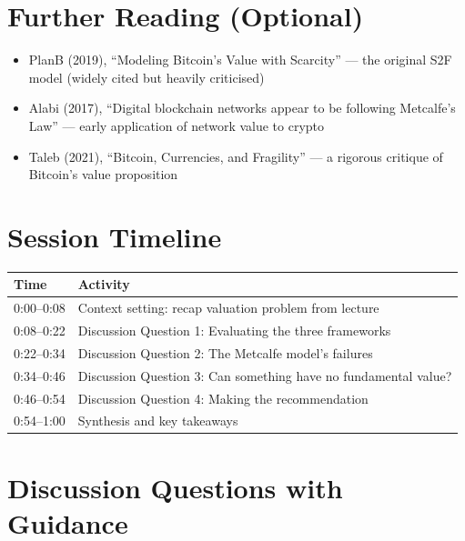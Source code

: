 \documentclass[11pt]{article}
\begin{document}
\section*{Further Reading (Optional)}

\begin{itemize}[leftmargin=*]
\item PlanB (2019), ``Modeling Bitcoin's Value with Scarcity'' --- the original S2F model (widely cited but heavily criticised)
\item Alabi (2017), ``Digital blockchain networks appear to be following Metcalfe's Law'' --- early application of network value to crypto
\item Taleb (2021), ``Bitcoin, Currencies, and Fragility'' --- a rigorous critique of Bitcoin's value proposition
\end{itemize}

\newpage


\section*{Session Timeline}

\begin{center}
\begin{tabular}{ll}
\toprule
\textbf{Time} & \textbf{Activity} \\
\midrule
0:00--0:08 & Context setting: recap valuation problem from lecture \\
0:08--0:22 & Discussion Question 1: Evaluating the three frameworks \\
0:22--0:34 & Discussion Question 2: The Metcalfe model's failures \\
0:34--0:46 & Discussion Question 3: Can something have no fundamental value? \\
0:46--0:54 & Discussion Question 4: Making the recommendation \\
0:54--1:00 & Synthesis and key takeaways \\
\bottomrule
\end{tabular}
\end{center}

\section*{Discussion Questions with Guidance}
\end{document}
